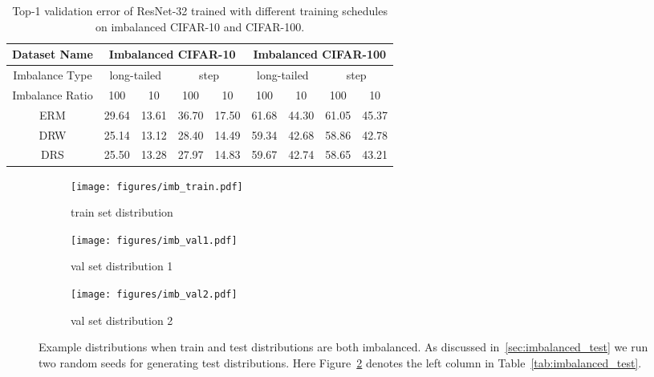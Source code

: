\documentclass{article}
\begin{document}
\begin{table}[]
\caption{Top-1 validation error of ResNet-32 trained with different training schedules on imbalanced CIFAR-10 and CIFAR-100.}
\label{tab:2-stage-table}
\centering
\begin{tabular}{c|cc|cc|cc|cc}
\toprule
Dataset Name           & \multicolumn{4}{c|}{Imbalanced CIFAR-10}                               & \multicolumn{4}{c}{Imbalanced CIFAR-100}                              \\ \midrule
Imbalance Type         & \multicolumn{2}{c|}{long-tailed} & \multicolumn{2}{c|}{step} & \multicolumn{2}{c|}{long-tailed} & \multicolumn{2}{c}{step} \\ \midrule
Imbalance Ratio        & \multicolumn{1}{c|}{100}  & 10 & \multicolumn{1}{c|}{100}   & 10   & \multicolumn{1}{c|}{100}  & 10 & \multicolumn{1}{c|}{100}   & 10   \\ \midrule
ERM & 29.64& 13.61& 36.70 & 17.50 & 61.68& 44.30 & 61.05& 45.37 \\
DRW & 25.14 & 13.12 & 28.40 & 14.49 & 59.34 & 42.68 & 58.86                            & 42.78      \\
DRS & 25.50 & 13.28 & 27.97 & 14.83 & 59.67 &  42.74   &   58.65                          & 43.21      \\\bottomrule
\end{tabular}
\end{table}

\begin{figure}
     \centering
     \begin{subfigure}[b]{0.32\textwidth}
         \centering
         \texttt{[image: figures/imb\_train.pdf]}
         \caption{train set distribution}
         \label{fig:exp_train}
     \end{subfigure}
     \hfill
     \begin{subfigure}[b]{0.32\textwidth}
         \centering
         \texttt{[image: figures/imb\_val1.pdf]}
         \caption{val set distribution 1}
         \label{fig:exp_val1}
     \end{subfigure}
     \hfill
     \begin{subfigure}[b]{0.32\textwidth}
         \centering
         \texttt{[image: figures/imb\_val2.pdf]}
         \caption{val set distribution 2}
         \label{fig:exp_val2}
     \end{subfigure}
        \caption{Example distributions when train and test distributions are both imbalanced. As discussed in~\ref{sec:imbalanced_test} we run two random seeds for generating test distributions. Here Figure~\ref{fig:exp_val1} denotes the left column in Table~\ref{tab:imbalanced_test}.}
        \label{fig:imb_test}
\end{figure}
\end{document}
